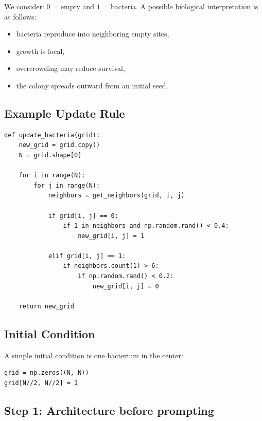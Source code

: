 \documentclass[paper=letter, fontsize=12pt]{article}
\numberwithin{equation}{section}
\begin{document}
We consider: $0$ = empty and $1$ = bacteria. A possible biological interpretation is as follows:
\begin{itemize}
\item bacteria reproduce into neighboring empty sites,
\item growth is local,
\item overcrowding may reduce survival,
\item the colony spreads outward from an initial seed.
\end{itemize}

\subsection*{Example Update Rule}

\begin{lstlisting}
def update_bacteria(grid):
    new_grid = grid.copy()
    N = grid.shape[0]

    for i in range(N):
        for j in range(N):
            neighbors = get_neighbors(grid, i, j)

            if grid[i, j] == 0:
                if 1 in neighbors and np.random.rand() < 0.4:
                    new_grid[i, j] = 1

            elif grid[i, j] == 1:
                if neighbors.count(1) > 6:
                    if np.random.rand() < 0.2:
                        new_grid[i, j] = 0

    return new_grid
\end{lstlisting}

\subsection*{Initial Condition}

A simple initial condition is one bacterium in the center:

\begin{lstlisting}
grid = np.zeros((N, N))
grid[N//2, N//2] = 1
\end{lstlisting}

\subsection*{Step 1: Architecture before prompting}
\end{document}
